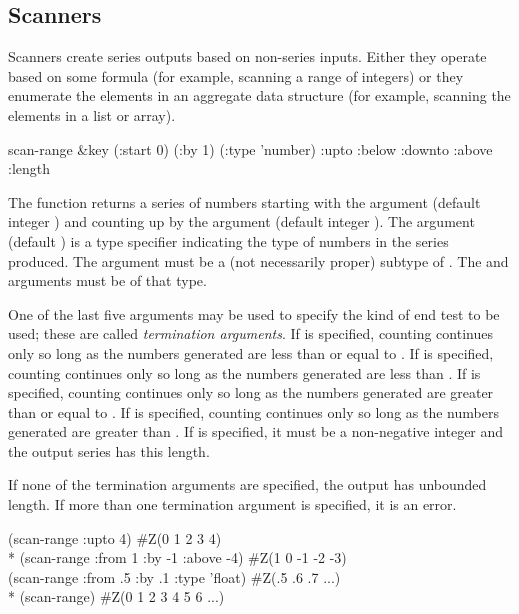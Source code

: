 \subsection{Scanners}

Scanners create series outputs based on non-series inputs.  Either they
operate based on some formula (for example, scanning a range of integers) or they
enumerate the elements in an aggregate data structure (for example, scanning the
elements in a list or array).


\begin{defun}[Function]
scan-range &key (:start 0) (:by 1) (:type 'number)
    :upto :below :downto :above :length

The function  returns a series of numbers starting with the
 argument
(default integer ) and counting up by the  argument (default
integer ).  The  argument (default ) is
a type specifier indicating the type of numbers in the series
produced.  The  argument must be a (not necessarily proper) subtype of
.  The  and  arguments must be of that type.

One of the last five arguments may be used
to specify the kind of end test to be used;
these are called \emph{termination arguments}.
If  is specified, counting continues only so long as the
numbers generated are less than or equal to .  If 
 is specified, counting continues only so long as the numbers
generated are less than .  If  is specified,
counting continues only so long as the numbers generated are greater
than or equal to .  If  is specified,
counting continues only so long as the numbers generated are greater
than .  If  is specified, it must be a
non-negative integer and the output series has this length.

If none
of the termination arguments are specified, the output has unbounded
length.  If more than one termination argument is specified, it is an error.

\begin{lisp}
(scan-range :upto 4) {\EV} \#Z(0 1 2 3 4) \\*
(scan-range :from 1 :by -1 :above -4) {\EV} \#Z(1 0 -1 -2 -3) \\
(scan-range :from .5 :by .1 :type 'float) {\EV} \#Z(.5 .6 .7 ...) \\*
(scan-range) {\EV} \#Z(0 1 2 3 4 5 6 ...)
\end{lisp}
\end{defun}

